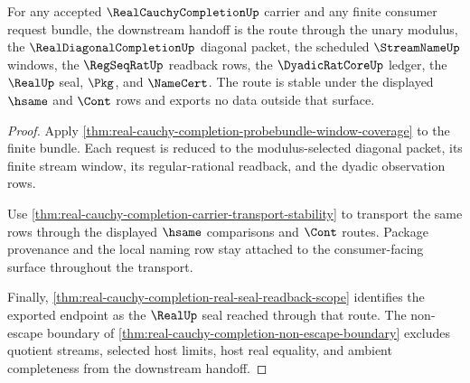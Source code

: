 \begin{theorem}
\label{thm:real-cauchy-completion-downstream-consumer-handoff}
For any accepted $\RealCauchyCompletionUp$ carrier and any finite consumer request bundle, the downstream handoff is the route through the unary modulus, the $\RealDiagonalCompletionUp$ diagonal packet, the scheduled $\StreamNameUp$ windows, the $\RegSeqRatUp$ readback rows, the $\DyadicRatCoreUp$ ledger, the $\RealUp$ seal, $\Pkg$, and $\NameCert$. The route is stable under the displayed $\hsame$ and $\Cont$ rows and exports no data outside that surface.
\end{theorem}
\begin{proof}
Apply \autoref{thm:real-cauchy-completion-probebundle-window-coverage} to the finite bundle. Each request is reduced to the modulus-selected diagonal packet, its finite stream window, its regular-rational readback, and the dyadic observation rows.

Use \autoref{thm:real-cauchy-completion-carrier-transport-stability} to transport the same rows through the displayed $\hsame$ comparisons and $\Cont$ routes. Package provenance and the local naming row stay attached to the consumer-facing surface throughout the transport.

Finally, \autoref{thm:real-cauchy-completion-real-seal-readback-scope} identifies the exported endpoint as the $\RealUp$ seal reached through that route. The non-escape boundary of \autoref{thm:real-cauchy-completion-non-escape-boundary} excludes quotient streams, selected host limits, host real equality, and ambient completeness from the downstream handoff.
\end{proof}

